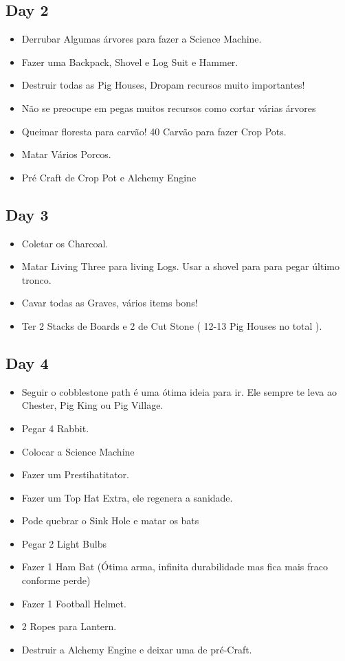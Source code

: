 \documentclass{article}
\begin{document}
\subsection{Day 2}
\begin{itemize}
    \item Derrubar Algumas árvores para fazer a Science Machine.
    \item Fazer uma Backpack, Shovel e Log Suit e Hammer.
    \item Destruir todas as Pig Houses, Dropam recursos muito importantes!
    \item Não se preocupe em pegas muitos recursos como cortar várias árvores
    \item Queimar floresta para carvão! 40 Carvão para fazer Crop Pots.
    \item Matar Vários Porcos.
    \item Pré Craft de Crop Pot e Alchemy Engine
\end{itemize}


\subsection{Day 3}
\begin{itemize}
    \item Coletar os Charcoal.
    \item Matar Living Three para living Logs. Usar a shovel para para pegar último tronco.
    \item Cavar todas as Graves, vários items bons!
    \item Ter 2 Stacks de Boards e 2 de Cut Stone ( 12-13 Pig Houses no total ).
\end{itemize}


\subsection{Day 4}
 \begin{itemize}
    \item Seguir o cobblestone path é uma ótima ideia para ir. Ele sempre te leva ao Chester, Pig King ou Pig Village.
    \item Pegar 4 Rabbit.
    \item Colocar a Science Machine
    \item Fazer um Prestihatitator.
    \item Fazer um Top Hat Extra, ele regenera a sanidade.
    \item Pode quebrar o Sink Hole e matar os bats
    \item Pegar 2 Light Bulbs
    \item Fazer 1 Ham Bat (Ótima arma, infinita durabilidade mas fica mais fraco conforme perde)
    \item Fazer 1 Football Helmet.
    \item 2 Ropes para Lantern.
    \item Destruir a Alchemy Engine e deixar uma de pré-Craft.
 \end{itemize}
\end{document}
